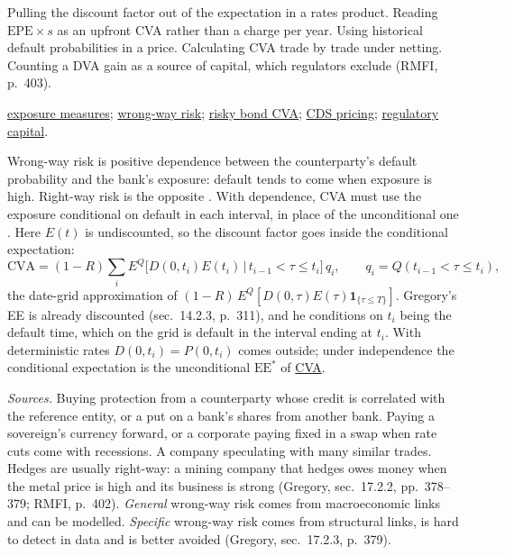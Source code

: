 \begin{qfmethod}
 Pulling the discount factor out of the expectation in a rates product. Reading $\mathrm{EPE}\times s$ as an upfront CVA rather than a charge per year. Using historical default probabilities in a price. Calculating CVA trade by trade under netting. Counting a DVA gain as a source of capital, which regulators exclude (RMFI, p.~403).

 \hyperref[def:counterparty-exposure-measures]{exposure measures}; \hyperref[def:wrong-way-risk]{wrong-way risk}; \hyperref[meth:risky-bond-cva]{risky bond CVA}; \hyperref[meth:cds-pricing]{CDS pricing}; \hyperref[rule:counterparty-credit-cva-capital]{regulatory capital}.

\end{qfmethod}

\begin{qfdefinition}\label{def:wrong-way-risk}
 Wrong-way risk is positive dependence between the counterparty's default probability and the bank's exposure: default tends to come when exposure is high. Right-way risk is the opposite \citep[chap.~18, sec.~18.5, pp.~401--402]{risk-management-financial-institutions-2023}. With dependence, CVA must use the exposure conditional on default in each interval, in place of the unconditional one \citep[chap.~17, sec.~17.3.1, eq.~(17.1), p.~380]{gregory-xva-challenge-2015}. Here $E(t)$ is undiscounted, so the discount factor goes inside the conditional expectation:
\[ \mathrm{CVA}=(1-R)\sum_iE^Q\big[D(0,t_i)E(t_i)\,\big|\,t_{i-1}<\tau\le t_i\big]\,q_i,\qquad q_i=Q(t_{i-1}<\tau\le t_i), \]
the date-grid approximation of $(1-R)\,E^Q[D(0,\tau)E(\tau)\mathbf 1_{\{\tau\le T\}}]$. Gregory's EE is already discounted (sec.~14.2.3, p.~311), and he conditions on $t_i$ being the default time, which on the grid is default in the interval ending at $t_i$. With deterministic rates $D(0,t_i)=P(0,t_i)$ comes outside; under independence the conditional expectation is the unconditional $\mathrm{EE}^*$ of \hyperref[meth:credit-valuation-adjustment]{CVA}.

\emph{Sources.} Buying protection from a counterparty whose credit is correlated with the reference entity, or a put on a bank's shares from another bank. Paying a sovereign's currency forward, or a corporate paying fixed in a swap when rate cuts come with recessions. A company speculating with many similar trades. Hedges are usually right-way: a mining company that hedges owes money when the metal price is high and its business is strong (Gregory, sec.~17.2.2, pp.~378--379; RMFI, p.~402). \emph{General} wrong-way risk comes from macroeconomic links and can be modelled. \emph{Specific} wrong-way risk comes from structural links, is hard to detect in data and is better avoided (Gregory, sec.~17.2.3, p.~379).


\end{qfdefinition}
